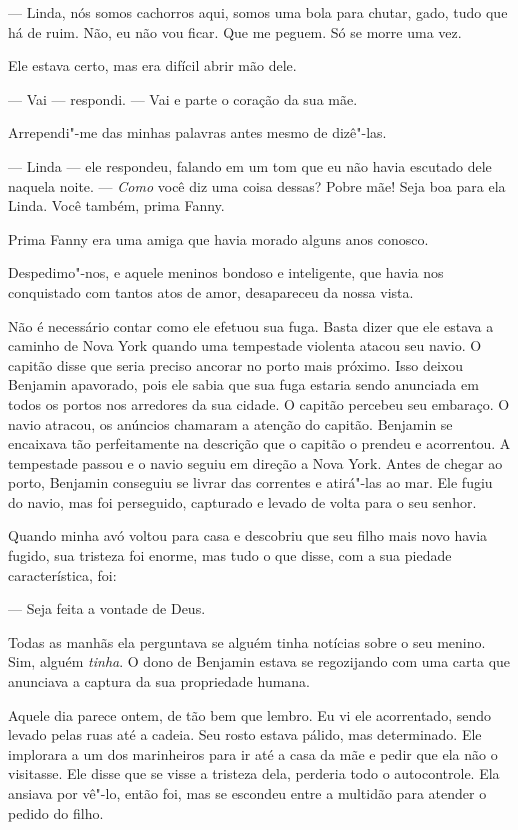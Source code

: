 --- Linda, nós somos cachorros aqui, somos uma bola para chutar, gado,
tudo que há de ruim. Não, eu não vou ficar. Que me peguem. Só se morre
uma vez.

Ele estava certo, mas era difícil abrir
mão dele.

--- Vai --- respondi. --- Vai e parte o coração da sua mãe.

Arrependi"-me das minhas palavras antes
mesmo de dizê"-las.

--- Linda --- ele respondeu, falando em
um tom que eu não havia escutado dele naquela noite. --- \emph{Como}
você diz uma coisa dessas? Pobre mãe! Seja boa para ela Linda. Você
também, prima Fanny.

Prima Fanny era uma amiga que havia
morado alguns anos conosco.

Despedimo"-nos, e aquele meninos bondoso e inteligente, que havia nos
conquistado com tantos atos de amor, desapareceu da nossa vista.

Não é necessário contar como ele
efetuou sua fuga. Basta dizer que ele estava a caminho de Nova York
quando uma tempestade violenta atacou seu navio. O capitão disse que
seria preciso ancorar no porto mais próximo. Isso deixou Benjamin
apavorado, pois ele sabia que sua fuga estaria sendo anunciada em todos
os portos nos arredores da sua cidade. O capitão percebeu seu embaraço.
O navio atracou, os anúncios chamaram a atenção do capitão. Benjamin se
encaixava tão perfeitamente na descrição que o capitão o prendeu e
acorrentou. A tempestade passou e o navio seguiu em direção a Nova York.
Antes de chegar ao porto, Benjamin conseguiu se livrar das correntes e
atirá"-las ao mar. Ele fugiu do navio, mas foi perseguido, capturado e
levado de volta para o seu senhor.

Quando minha avó voltou para casa e
descobriu que seu filho mais novo havia fugido, sua tristeza foi enorme,
mas tudo o que disse, com a sua piedade característica, foi:

--- Seja feita a vontade de Deus.

Todas as manhãs ela perguntava se alguém tinha notícias sobre o seu
menino. Sim, alguém \emph{tinha}. O dono de Benjamin estava se
regozijando com uma carta que anunciava a captura da sua propriedade
humana.

Aquele dia parece ontem, de tão bem que
lembro. Eu vi ele acorrentado, sendo levado pelas ruas até a cadeia. Seu
rosto estava pálido, mas determinado. Ele implorara a um dos marinheiros
para ir até a casa da mãe e pedir que ela não o visitasse. Ele disse que
se visse a tristeza dela, perderia todo o autocontrole. Ela ansiava por
vê"-lo, então foi, mas se escondeu entre a multidão para atender o pedido
do filho.

